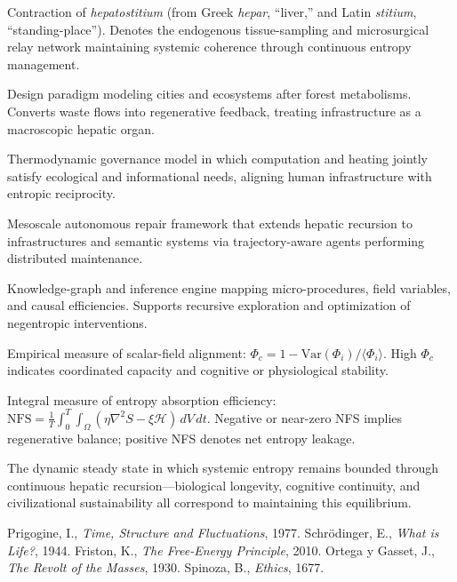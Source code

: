 \documentclass[12pt]{article}
\begin{document}
\begin{description}[leftmargin=2em, labelwidth=1.5em, style=nextline]
  \item[Hepastitium] 
  Contraction of \emph{hepatostitium} (from Greek \emph{hepar}, “liver,” and Latin \emph{stitium}, “standing-place”).  Denotes the endogenous tissue-sampling and microsurgical relay network maintaining systemic coherence through continuous entropy management.

  \item[Xylomorphic Architecture] 
  Design paradigm modeling cities and ecosystems after forest metabolisms.  Converts waste flows into regenerative feedback, treating infrastructure as a macroscopic hepatic organ.

  \item[Proof-of-Useful-Work-and-Heat] 
  Thermodynamic governance model in which computation and heating jointly satisfy ecological and informational needs, aligning human infrastructure with entropic reciprocity.

  \item[Yarncrawler] 
  Mesoscale autonomous repair framework that extends hepatic recursion to infrastructures and semantic systems via trajectory-aware agents performing distributed maintenance.

  \item[Semantic Microscope] 
  Knowledge-graph and inference engine mapping micro-procedures, field variables, and causal efficiencies.  Supports recursive exploration and optimization of negentropic interventions.

  \item[\(\Phi_c\)-Coherence Index] 
  Empirical measure of scalar-field alignment:
  \(\Phi_c = 1 - \mathrm{Var}(\Phi_i)/\langle \Phi_i\rangle\).  
  High \(\Phi_c\) indicates coordinated capacity and cognitive or physiological stability.

  \item[Negentropic Flux Score (NFS)] 
  Integral measure of entropy absorption efficiency:
  \(\mathrm{NFS} = \frac{1}{T}\int_0^T\!\!\int_\Omega(\eta\nabla^2 S - \xi\mathcal{H})\,dV\,dt.\)
  Negative or near-zero NFS implies regenerative balance; positive NFS denotes net entropy leakage.

  \item[Regenerative Equilibrium] 
  The dynamic steady state in which systemic entropy remains bounded through continuous hepatic recursion—biological longevity, cognitive continuity, and civilizational sustainability all correspond to maintaining this equilibrium.
\end{description}


\begin{thebibliography}{9}
 Prigogine, I., \emph{Time, Structure and Fluctuations}, 1977.
 Schrödinger, E., \emph{What is Life?}, 1944.
 Friston, K., \emph{The Free-Energy Principle}, 2010.
 Ortega y Gasset, J., \emph{The Revolt of the Masses}, 1930.
 Spinoza, B., \emph{Ethics}, 1677.
\end{thebibliography}
\end{document}
